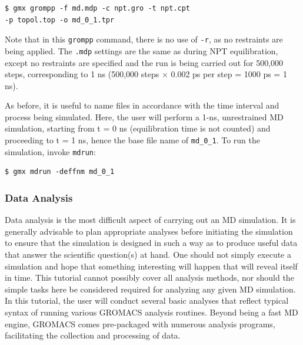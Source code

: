\documentclass[9pt,tutorial]{livecoms}
\begin{document}
\begin{verbatim}
$ gmx grompp -f md.mdp -c npt.gro -t npt.cpt 
-p topol.top -o md_0_1.tpr
\end{verbatim}

Note that in this \texttt{grompp} command, there is no use of \texttt{-r}, as no restraints are being applied. The \texttt{.mdp} settings are the same as during NPT equilibration, except no restraints are specified and the run is being carried out for 500,000 steps, corresponding to 1 ns (500,000 steps $\times$ 0.002 ps per step = 1000 ps = 1 ns).

As before, it is useful to name files in accordance with the time interval and process being simulated. Here, the user will perform a 1-ns, unrestrained MD simulation, starting from t = 0 ns (equilibration time is not counted) and proceeding to t = 1 ns, hence the base file name of \texttt{md\_0\_1}. To run the simulation, invoke \texttt{mdrun}:

\begin{verbatim}
$ gmx mdrun -deffnm md_0_1
\end{verbatim}

\subsubsection{Data Analysis} \label{lyso_ana}

Data analysis is the most difficult aspect of carrying out an MD simulation. It is generally advisable to plan appropriate analyses before initiating the simulation to ensure that the simulation is designed in such a way as to produce useful data that answer the scientific question(s) at hand. One should not simply execute a simulation and hope that something interesting will happen that will reveal itself in time. This tutorial cannot possibly cover all analysis methods, nor should the simple tasks here be considered required for analyzing any given MD simulation. In this tutorial, the user will conduct several basic analyses that reflect typical syntax of running various GROMACS analysis routines. Beyond being a fast MD engine, GROMACS comes pre-packaged with numerous analysis programs, facilitating the collection and processing of data.
\end{document}
